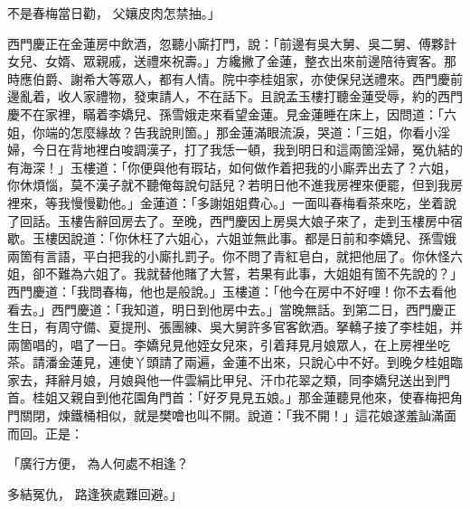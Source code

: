 \begin{showcontents}{}
不是春梅當日勸，  父孃皮肉怎禁抽。」

西門慶正在金蓮房中飲酒，忽聽小廝打門，說：「前邊有吳大舅、吳二舅、傅夥計女兒、女婿、眾親戚，送禮來祝壽。」方纔撇了金蓮，整衣出來前邊陪待賓客。那時應伯爵、謝希大等眾人，都有人情。院中李桂姐家，亦使保兒送禮來。西門慶前邊亂着，收人家禮物，發柬請人，不在話下。且說孟玉樓打聽金蓮受辱，約的西門慶不在家裡，瞞着李嬌兒、孫雪娥走來看望金蓮。見金蓮睡在床上，因問道：「六姐，你端的怎麼緣故？告我說則箇。」那金蓮滿眼流淚，哭道：「三姐，你看小淫婦，今日在背地裡白唆調漢子，打了我恁一頓，我到明日和這兩箇淫婦，冤仇結的有海深！」玉樓道：「你便與他有瑕玷，如何做作着把我的小廝弄出去了？六姐，你休煩惱，莫不漢子就不聽俺每說句話兒？若明日他不進我房裡來便罷，但到我房裡來，等我慢慢勸他。」金蓮道：「多謝姐姐費心。」一面叫春梅看茶來吃，坐着說了回話。玉樓告辭回房去了。至晚，西門慶因上房吳大娘子來了，走到玉樓房中宿歇。玉樓因說道：「你休枉了六姐心，六姐並無此事。都是日前和李嬌兒、孫雪娥兩箇有言語，平白把我的小廝扎罰子。你不問了青紅皂白，就把他屈了。你休怪六姐，卻不難為六姐了。我就替他賭了大誓，若果有此事，大姐姐有箇不先說的？」西門慶道：「我問春梅，他也是般說。」玉樓道：「他今在房中不好哩！你不去看他看去。」西門慶道：「我知道，明日到他房中去。」當晚無話。到第二日，西門慶正生日，有周守備、夏提刑、張團練、吳大舅許多官客飲酒。拏轎子接了李桂姐，并兩箇唱的，唱了一日。李嬌兒見他姪女兒來，引着拜見月娘眾人，在上房裡坐吃茶。請潘金蓮見，連使丫頭請了兩遍，金蓮不出來，只說心中不好。到晚夕桂姐臨家去，拜辭月娘，月娘與他一件雲絹比甲兒、汗巾花翠之類，同李嬌兒送出到門首。桂姐又親自到他花園角門首：「好歹見見五娘。」那金蓮聽見他來，使春梅把角門關閉，煉鐵桶相似，就是樊噲也叫不開。說道：「我不開！」這花娘遂羞訕滿面而回。正是：

「廣行方便，  為人何處不相逢？

多結冤仇，  路逢狹處難回避。」


\end{showcontents}
